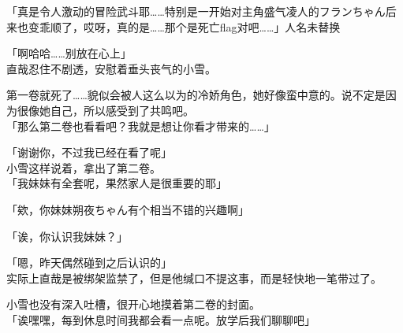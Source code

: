 「真是令人激动的冒险武斗耶……特别是一开始对主角盛气凌人的フランちゃん后来也变乖顺了，哎呀，真的是……那个是死亡flag对吧……」人名未替换

「啊哈哈……别放在心上」\\

直哉忍住不剧透，安慰着垂头丧气的小雪。

第一卷就死了……貌似会被人这么以为的冷娇角色，她好像蛮中意的。说不定是因为很像她自己，所以感受到了共鸣吧。\\

「那么第二卷也看看吧？我就是想让你看才带来的……」

「谢谢你，不过我已经在看了呢」\\

小雪这样说着，拿出了第二卷。\\

「我妹妹有全套呢，果然家人是很重要的耶」

「欸，你妹妹朔夜ちゃん有个相当不错的兴趣啊」%

「诶，你认识我妹妹？」

「嗯，昨天偶然碰到之后认识的」\\

实际上直哉是被绑架监禁了，但是他缄口不提这事，而是轻快地一笔带过了。

小雪也没有深入吐槽，很开心地摸着第二卷的封面。\\

「诶嘿嘿，每到休息时间我都会看一点呢。放学后我们聊聊吧」

